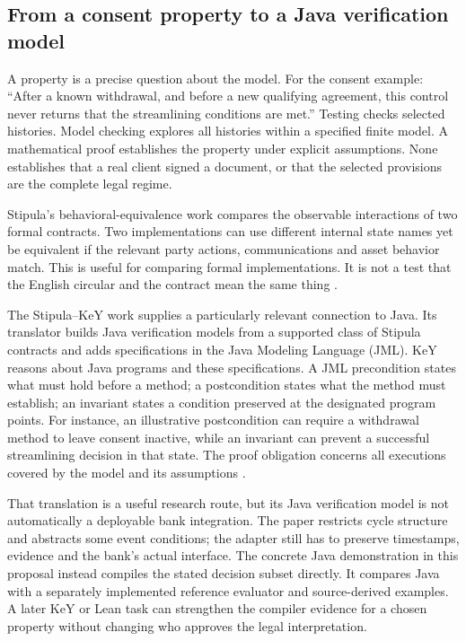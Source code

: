 \subsection{From a consent property to a Java verification model}
\label{merge:P-01a-language-lesson:04}


A property is a precise question about the model. For the consent example:
``After a known withdrawal, and before a new qualifying agreement, this control
never returns that the streamlining conditions are met.'' Testing checks selected
histories. Model checking explores all histories within a specified finite
model. A mathematical proof establishes the property under explicit assumptions.
None establishes that a real client signed a document, or that the selected
provisions are the complete legal regime.

Stipula's behavioral-equivalence work compares the observable interactions of
two formal contracts. Two implementations can use different internal state names
yet be equivalent if the relevant party actions, communications and asset
behavior match. This is useful for comparing formal implementations. It is not
a test that the English circular and the contract mean the same thing
\citep[sec.~5]{stipula2021}.


The Stipula--KeY work supplies a particularly relevant connection to Java.
Its translator builds Java verification models from a supported class of
Stipula contracts and adds specifications in the Java Modeling Language (JML).
KeY reasons about Java programs and these specifications. A JML precondition
states what must hold before a method; a postcondition states what the method
must establish; an invariant states a condition preserved at the designated
program points. For instance, an illustrative postcondition can require a
withdrawal method to leave consent inactive, while an invariant can prevent a
successful streamlining decision in that state. The proof obligation concerns
all executions covered by the model and its assumptions
\citep[secs.~3--5]{stipulakey2025,stipulakeycode}.

That translation is a useful research route, but its Java verification model is
not automatically a deployable bank integration. The paper restricts cycle
structure and abstracts some event conditions; the adapter still has to preserve
timestamps, evidence and the bank's actual interface. The concrete Java
demonstration in this proposal instead compiles the stated decision subset
directly. It compares Java with a separately implemented reference evaluator
and source-derived examples. A later KeY or Lean task can strengthen the
compiler evidence for a chosen property without changing who approves the
legal interpretation.

